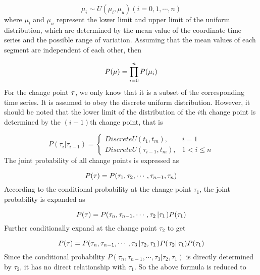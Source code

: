 \documentclass[final,3p,times]{elsarticle}
\begin{document}
	\begin{equation}\label{eq_bayesian_prior_mu}
	{\mu _i} \sim U({\mu_l },{\mu_u })(i = 0,1, \cdots ,n)
	\end{equation}
	where $\mu_l$ and $\mu_u$ represent the lower limit and  upper limit of the uniform distribution, which are determined by the mean value of the coordinate time series and the possible range of variation. Assuming that the mean values of each segment are independent of each other, then
	
	\begin{equation}\label{eq_bayesian_prior_mu_sum}
	P({\bf{\mu }}) = \prod\limits_{i = 0}^n {P({\mu _i})}
	\end{equation}
	For the change point ${\bf{\tau }}$, we only know that it is a subset of the corresponding time series.
	It is assumed to obey the discrete uniform distribution. However, it should be noted that the lower limit of the distribution of the $i$th change point is determined by the $(i-1)$th change point, that is
	
	\begin{equation}\label{eq_bayesian_prior_tau_basic}
	P({\tau _i}\left| {{\tau _{i - 1}}} \right.) = \left\{ {\begin{array}{*{20}{r}}
		{DiscreteU({t_1},{t_m}),}&{i = 1}\\
		{DiscreteU({\tau _{i - 1}},{t_m}),}&{1 < i \le n}
		\end{array}} \right.
	\end{equation}
	The joint probability of all change points is expressed as
	
	\begin{equation}\label{eq_bayesian_prior_tau_1}
	P({\bf{\tau }}) = P({\tau _1},{\tau _2}, \cdots ,{\tau _{n - 1}},{\tau _n})
	\end{equation}
	According to the conditional probability at the change point ${\tau _1}$, the joint probability is expanded as
	
	\begin{equation}\label{eq_bayesian_prior_tau_2}
	P({\bf{\tau }}) = P({\tau _n},{\tau _{n - 1}}, \cdots ,{\tau _2}\left| {{\tau _1}} \right.)P({\tau _1})
	\end{equation}
	Further conditionally expand at the change point ${\tau _2}$ to get
	
	\begin{equation}\label{eq_bayesian_prior_tau_3}
	P({\bf{\tau }}) = P({\tau _n},{\tau _{n - 1}}, \cdots ,{\tau _3}\left| {{\tau _2},{\tau _1}} \right.)P(\left. {{\tau _2}} \right|{\tau _1})P({\tau _1})
	\end{equation}
	Since the conditional probability $P({\tau _n},{\tau _{n - 1}}, \cdots ,{\tau _3}\left| {{\tau _2},{\tau _1}} \right.)$ is directly determined by ${\tau _2}$, it has no direct relationship with ${\tau _1}$. So the above formula is reduced to
	
\end{document}
